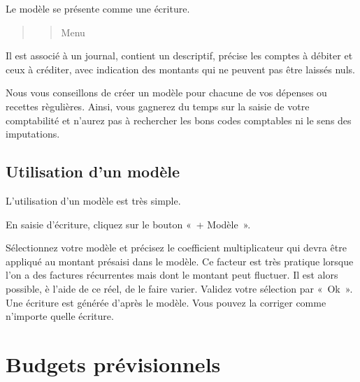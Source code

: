 \documentclass[a4paper,10pt,oneside,french]{sphinxmanual}
\begin{document}
\sphinxAtStartPar
Le modèle se présente comme une écriture.
\begin{quote}
\begin{quote}

\sphinxAtStartPar
Menu 
\end{quote}

\noindent{}
\end{quote}

\sphinxAtStartPar
Il est associé à un journal, contient un descriptif, précise les comptes à débiter et ceux à créditer, avec indication des montants qui ne peuvent pas être laissés nuls.
\begin{quote}

\noindent{}
\end{quote}

\sphinxAtStartPar
Nous vous conseillons de créer un modèle pour chacune de vos dépenses ou recettes règulières. Ainsi, vous gagnerez du temps sur la saisie de votre comptabilité et n’aurez pas à rechercher les bons codes comptables ni le sens des imputations.


\subsection{Utilisation d’un modèle}
\label{\detokenize{accounting/model:utilisation-d-un-modele}}
\sphinxAtStartPar
L’utilisation d’un modèle est très simple.

\sphinxAtStartPar
En saisie d’écriture, cliquez sur le bouton « + Modèle ».
\begin{quote}

\noindent{}
\end{quote}

\sphinxAtStartPar
Sélectionnez votre modèle et précisez le coefficient multiplicateur qui devra être appliqué au montant présaisi dans le modèle. Ce facteur est très pratique lorsque l’on a des factures récurrentes mais dont le montant peut fluctuer. Il est alors possible, è l’aide de ce réel, de le faire varier.
Validez votre sélection par « Ok ». Une écriture est générée d’après le modèle. Vous pouvez la corriger comme n’importe quelle écriture.


\section{Budgets prévisionnels}
\label{\detokenize{accounting/budget:budgets-previsionnels}}\label{\detokenize{accounting/budget::doc}}
\end{document}
